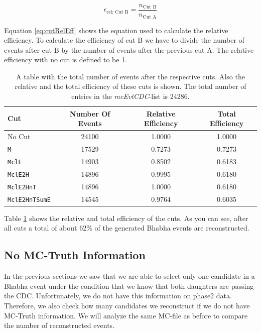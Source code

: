 \documentclass[a4paper,11pt,twosided,final,german,openbib,pdftex,listof=totoc,bibliography=totoc]{scrbook}
\begin{document}
\begin{equation}
	\epsilon_{\textrm{rel; Cut B}} = \frac{n_{\textrm{Cut B}}}{n_{\textrm{Cut A}}}
	\label{eq:cutRelEff}
\end{equation}

Equation \ref{eq:cutRelEff} shows the equation used to calculate the relative efficiency. To calculate the efficiency of cut B we have to divide the number of events after cut B by the number of events after the previous
cut A. The relative efficiency with no cut is defined to be 1.

\begin{table}[h!]
	\centering
\begin{tabular}{lccc}
 Cut& Number Of Events&  Relative Efficiency& Total Efficiency\\
 \hline
 No Cut&24100 &1.0000 &1.0000 \\
 \texttt{M}& 17529&0.7273 &0.7273 \\
 \texttt{MclE}&14903 &0.8502 &0.6183 \\
 \texttt{MclE2H}&14896&0.9995  &0.6180 \\
 \texttt{MclE2HnT}&14896 &1.0000 &0.6180 \\
 \texttt{MclE2HnTSumE}& 14545 &0.9764 &0.6035 \\

\end{tabular}

\caption[Cut Efficiencies]{A table with the total number of events after the respective cuts. Also the relative and the total efficiency of these cuts is shown. The total number of entries in the \textit{mcEvtCDC}-list is 24286.}
\label{tab:cutEff}
\end{table}

Table \ref{tab:cutEff} shows the relative and total efficiency of the cuts.
As you can see, after all cuts a total of about $62\%$ of the generated Bhabha events are reconstructed. 

\subsection{No MC-Truth Information}
\label{sec:NoMCT}

In the previous sections we saw that we are able to select only one candidate in a Bhabha event under the condition that we know that both daughters are passing the CDC. Unfortunately, we do not have this information on phase2 data. Therefore, we also check how many candidates we reconstruct if we do not have MC-Truth information. We will analyze the same MC-file as before to compare the number of reconstructed events. 
\end{document}
